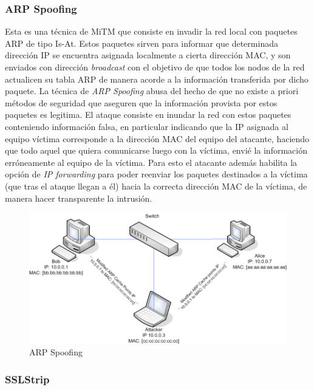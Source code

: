 \documentclass[10pt,a4paper]{article}
\begin{document}
\subsubsection{ARP Spoofing}

Esta es una técnica de MiTM que consiste en invadir la red local con paquetes ARP de tipo Is-At. Estos paquetes sirven para informar que determinada dirección IP se encuentra asignada localmente a cierta dirección MAC, y son enviados con dirección \textit{broadcast} con el objetivo de que todos los nodos de la red actualicen su tabla ARP de manera acorde a la información transferida por dicho paquete. La técnica de \textit{ARP Spoofing} abusa del hecho de que no existe a priori métodos de seguridad que aseguren que la información provista por estos paquetes es legitima. El ataque consiste en inundar la red con estos paquetes conteniendo información falsa, en particular indicando que la IP asignada al equipo víctima corresponde a la dirección MAC del equipo del atacante, haciendo que todo aquel que quiera comunicarse luego con la víctima, envié la información erróneamente al equipo de la víctima. Para esto el atacante además habilita la opción de \textit{IP forwarding} para poder reenviar los paquetes destinados a la víctima (que tras el ataque llegan a él) hacia la correcta dirección MAC de la víctima, de manera hacer transparente la intrusión. 

\begin{figure}[H]
\centerline{\includegraphics[scale=0.4]{images/arp_spoofing.png}}
\caption{ARP Spoofing}
\end{figure}

\subsubsection{SSLStrip}
\end{document}
